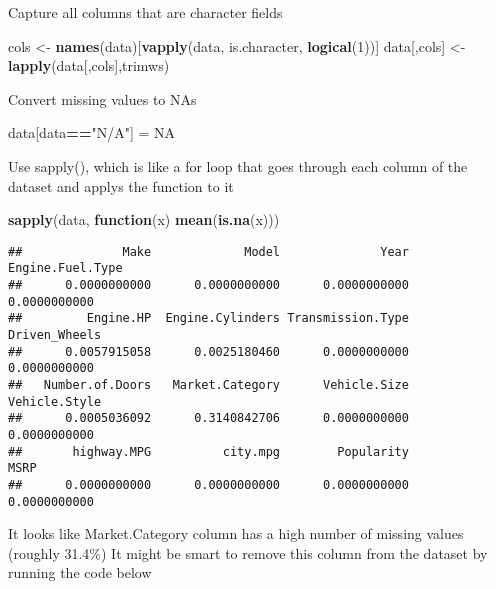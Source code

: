 \documentclass[
]{article}
\newenvironment{Shaded}{\begin{snugshade}}{\end{snugshade}}
\newcommand{\ControlFlowTok}[1]{\textcolor[rgb]{0.13,0.29,0.53}{\textbf{#1}}}
\newcommand{\DecValTok}[1]{\textcolor[rgb]{0.00,0.00,0.81}{#1}}
\newcommand{\KeywordTok}[1]{\textcolor[rgb]{0.13,0.29,0.53}{\textbf{#1}}}
\newcommand{\NormalTok}[1]{#1}
\newcommand{\OperatorTok}[1]{\textcolor[rgb]{0.81,0.36,0.00}{\textbf{#1}}}
\newcommand{\OtherTok}[1]{\textcolor[rgb]{0.56,0.35,0.01}{#1}}
\newcommand{\StringTok}[1]{\textcolor[rgb]{0.31,0.60,0.02}{#1}}
\begin{document}
Capture all columns that are character fields

\begin{Shaded}
\begin{Highlighting}[]
\NormalTok{cols <-}\StringTok{ }\KeywordTok{names}\NormalTok{(data)[}\KeywordTok{vapply}\NormalTok{(data, is.character, }\KeywordTok{logical}\NormalTok{(}\DecValTok{1}\NormalTok{))]}
\NormalTok{data[,cols] <-}\StringTok{ }\KeywordTok{lapply}\NormalTok{(data[,cols],trimws)}
\end{Highlighting}
\end{Shaded}

Convert missing values to NAs

\begin{Shaded}
\begin{Highlighting}[]
\NormalTok{data[data}\OperatorTok{==}\StringTok{"N/A"}\NormalTok{] =}\StringTok{ }\OtherTok{NA}
\end{Highlighting}
\end{Shaded}

Use sapply(), which is like a for loop that goes through each column of
the dataset and applys the function to it

\begin{Shaded}
\begin{Highlighting}[]
\KeywordTok{sapply}\NormalTok{(data, }\ControlFlowTok{function}\NormalTok{(x) }\KeywordTok{mean}\NormalTok{(}\KeywordTok{is.na}\NormalTok{(x)))}
\end{Highlighting}
\end{Shaded}

\begin{verbatim}
##              Make             Model              Year  Engine.Fuel.Type 
##      0.0000000000      0.0000000000      0.0000000000      0.0000000000 
##         Engine.HP  Engine.Cylinders Transmission.Type     Driven_Wheels 
##      0.0057915058      0.0025180460      0.0000000000      0.0000000000 
##   Number.of.Doors   Market.Category      Vehicle.Size     Vehicle.Style 
##      0.0005036092      0.3140842706      0.0000000000      0.0000000000 
##       highway.MPG          city.mpg        Popularity              MSRP 
##      0.0000000000      0.0000000000      0.0000000000      0.0000000000
\end{verbatim}

It looks like Market.Category column has a high number of missing values
(roughly 31.4\%) It might be smart to remove this column from the
dataset by running the code below
\end{document}
